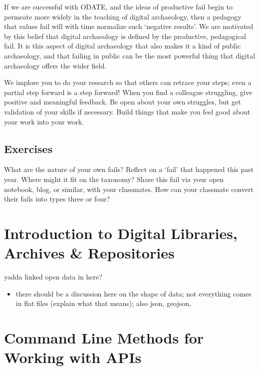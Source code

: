 \documentclass[english,]{book}
\providecommand{\tightlist}{%
  \setlength{\itemsep}{0pt}\setlength{\parskip}{0pt}}
\begin{document}
If we are successful with ODATE, and the ideas of productive fail begin
to permeate more widely in the teaching of digital archaeology, then a
pedagogy that values fail will with time normalize such `negative
results'. We are motivated by this belief that digital archaeology is
defined by the productive, pedagogical fail. It is this aspect of
digital archaeology that also makes it a kind of public archaeology, and
that failing in public can be the most powerful thing that digital
archaeology offers the wider field.

We implore you to do your research so that others can retrace your
steps; even a partial step forward is a step forward! When you find a
colleague struggling, give positive and meaningful feedback. Be open
about your own struggles, but get validation of your skills if
necessary. Build things that make you feel good about your work into
your work.

\subsection{Exercises}\label{exercises-4}

What are the nature of your own fails? Reflect on a `fail' that happened
this past year. Where might it fit on the taxonomy? Share this fail via
your open notebook, blog, or similar, with your classmates. How can your
classmate convert their fails into types three or four?

\hypertarget{introduction-to-digital-libraries-archives-repositories}{\section{Introduction
to Digital Libraries, Archives \&
Repositories}\label{introduction-to-digital-libraries-archives-repositories}}

yadda linked open data in here?

\begin{itemize}
\tightlist
\item
  there should be a discussion here on the shape of data; not everything
  comes in flat files (explain what that means); also json, geojson,
\end{itemize}

\section{Command Line Methods for Working with
APIs}\label{command-line-methods-for-working-with-apis}
\end{document}

